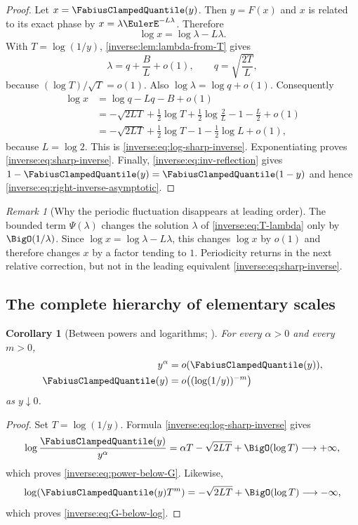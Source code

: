 \documentclass[11pt,oneside]{article}
\newtheorem{corollary}[corollary]{Corollary}
\theoremstyle{definition}
\theoremstyle{remark}
\newtheorem{remark}[remark]{Remark}
\begin{document}
\begin{proof}
Let $x=\FabiusClampedQuantile(y)$.  Then $y=F(x)$ and $x$ is related to its exact phase by
$x=\lambda\EulerE^{-L\lambda}$.  Therefore
\[
 \log x=\log\lambda-L\lambda.
\]
With $T=\log(1/y)$, \cref{inverse:lem:lambda-from-T} gives
\[
 \lambda=q+\frac BL+o(1),\qquad
 q=\sqrt{\frac{2T}{L}},
\]
because $(\log T)/\sqrt T=o(1)$.  Also $\log\lambda=\log q+o(1)$.
Consequently
\begin{align*}
 \log x
 &=\log q-Lq-B+o(1)\\
 &=-\sqrt{2LT}
   +\frac12\log T+\frac12\log\frac2L
   -1-\frac L2+o(1)\\
 &=-\sqrt{2LT}
   +\frac12\log T-1-\frac12\log L+o(1),
\end{align*}
because $L=\log2$.  This is \eqref{inverse:eq:log-sharp-inverse}.
Exponentiating proves \eqref{inverse:eq:sharp-inverse}.  Finally,
\eqref{inverse:eq:inv-reflection} gives
$1-\FabiusClampedQuantile(y)=\FabiusClampedQuantile(1-y)$ and hence
\eqref{inverse:eq:right-inverse-asymptotic}.
\end{proof}

\begin{remark}[Why the periodic fluctuation disappears at leading order]
The bounded term $\Psi(\lambda)$ changes the solution $\lambda$ of
\eqref{inverse:eq:T-lambda} only by $\BigO(1/\lambda)$.  Since
$\log x=\log\lambda-L\lambda$, this changes $\log x$ by $o(1)$ and
therefore changes $x$ by a factor tending to $1$.  Periodicity returns in
the next relative correction, but not in the leading equivalent
\eqref{inverse:eq:sharp-inverse}.
\end{remark}

\subsection{The complete hierarchy of elementary scales}

\begin{corollary}[Between powers and logarithms; \Derived]
\label{inverse:cor:inverse-scale-hierarchy}
For every $\alpha>0$ and every $m>0$,
\begin{align}
 y^\alpha&=o(\FabiusClampedQuantile(y)), \label{inverse:eq:power-below-G}\\
 \FabiusClampedQuantile(y)&=o\!\left((\log(1/y))^{-m}\right)
 \label{inverse:eq:G-below-log}
\end{align}
as $y\downarrow0$.
\end{corollary}

\begin{proof}
Set $T=\log(1/y)$.  Formula \eqref{inverse:eq:log-sharp-inverse} gives
\[
 \log\frac{\FabiusClampedQuantile(y)}{y^\alpha}
 =\alpha T-\sqrt{2LT}+\BigO(\log T)\longrightarrow+\infty,
\]
which proves \eqref{inverse:eq:power-below-G}.  Likewise,
\[
 \log\!\left(\FabiusClampedQuantile(y)T^m\right)
 =-\sqrt{2LT}+\BigO(\log T)\longrightarrow-\infty,
\]
which proves \eqref{inverse:eq:G-below-log}.
\end{proof}
\end{document}
